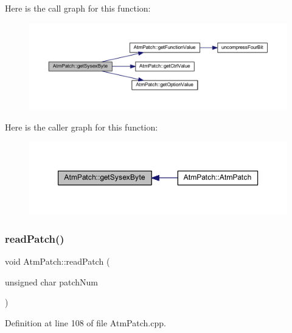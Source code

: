 Here is the call graph for this function\+:
\nopagebreak
\begin{figure}[H]
\begin{center}
\leavevmode
\includegraphics[width=350pt]{class_atm_patch_a48b5b2d71e4b83b80979a68372e935ae_cgraph}
\end{center}
\end{figure}
Here is the caller graph for this function\+:
\nopagebreak
\begin{figure}[H]
\begin{center}
\leavevmode
\includegraphics[width=350pt]{class_atm_patch_a48b5b2d71e4b83b80979a68372e935ae_icgraph}
\end{center}
\end{figure}
\mbox{\label{class_atm_patch_a9689db39f28d3c7d0fcaa6966c82e2d6}} 
\subsubsection{\texorpdfstring{read\+Patch()}{readPatch()}}
{\footnotesize\ttfamily void Atm\+Patch\+::read\+Patch (\begin{DoxyParamCaption}\item[{unsigned char}]{patch\+Num }\end{DoxyParamCaption})}



Definition at line 108 of file Atm\+Patch.\+cpp.

